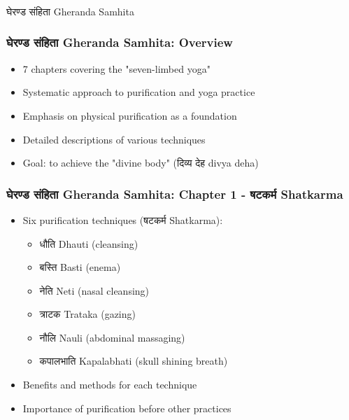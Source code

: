 \begin{frame}[fragile]\frametitle{}
\begin{center}
{\Large घेरण्ड संहिता  Gheranda Samhita}
\end{center}
\end{frame}



\begin{frame}[fragile]\frametitle{घेरण्ड संहिता  Gheranda Samhita: Overview}
\begin{itemize}
    \item 7 chapters covering the "seven-limbed yoga"
    \item Systematic approach to purification and yoga practice
    \item Emphasis on physical purification as a foundation
    \item Detailed descriptions of various techniques
    \item Goal: to achieve the "divine body" (दिव्य देह divya deha)
\end{itemize}
\end{frame}

\begin{frame}[fragile]\frametitle{घेरण्ड संहिता Gheranda Samhita: Chapter 1 - षटकर्म  Shatkarma}
\begin{itemize}
    \item Six purification techniques (षटकर्म  Shatkarma):
    \begin{itemize}
        \item धौति  Dhauti (cleansing)
        \item बस्ति  Basti (enema)
        \item नेति  Neti (nasal cleansing)
        \item त्राटक  Trataka (gazing)
        \item नौलि Nauli (abdominal massaging)
        \item कपालभाति  Kapalabhati (skull shining breath)
    \end{itemize}
    \item Benefits and methods for each technique
    \item Importance of purification before other practices
\end{itemize}
\end{frame}

